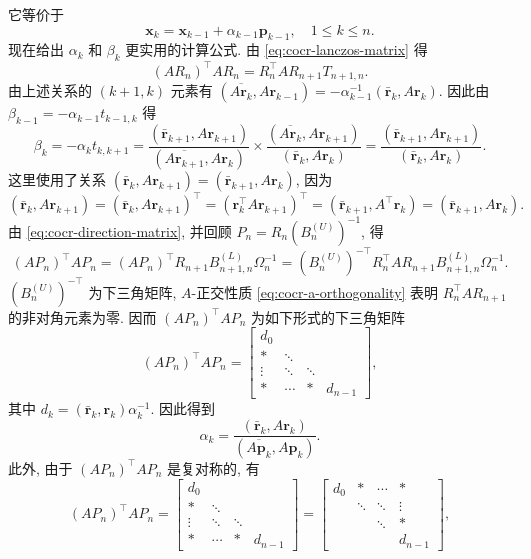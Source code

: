 {它等价于}
\begin{equation}\label{eq:cocr-solution-recurrence}\bm x_k=\bm x_{k-1}+\alpha_{k-1}\bm p_{k-1},\quad1\le k\le n.\end{equation}
{现在给出 $\alpha_k$ 和 $\beta_k$ 更实用的计算公式. 由 \eqref{eq:cocr-lanczos-matrix} 得}
\[(AR_n)^{\top}AR_n=R_n^{\top}AR_{n+1}T_{n+1,n}.\]
{由上述关系的 $(k+1,k)$ 元素有 $(\overline{A\bm r_k},A\bm r_{k-1})=-\alpha_{k-1}^{-1}(\bar{\bm r}_k,A\bm r_k)$. 因此由 $\beta_{k-1}=-\alpha_{k-1}t_{k-1,k}$ 得}
\begin{equation}\label{eq:cocr-beta}
\beta_k=-\alpha_kt_{k,k+1}=\frac{(\bar{\bm r}_{k+1},A\bm r_{k+1})}{(\overline{A\bm r_{k+1}},A\bm r_k)}\times\frac{(\overline{A\bm r_k},A\bm r_{k+1})}{(\bar{\bm r}_k,A\bm r_k)}=\frac{(\bar{\bm r}_{k+1},A\bm r_{k+1})}{(\bar{\bm r}_k,A\bm r_k)}.
\end{equation}
{这里使用了关系 $(\bar{\bm r}_k,A\bm r_{k+1})=(\bar{\bm r}_{k+1},A\bm r_k)$, 因为}
\begin{equation}\label{eq:cocr-bilinear-symmetry}
(\bar{\bm r}_k,A\bm r_{k+1})=(\bar{\bm r}_k,A\bm r_{k+1})^{\top}=(\bm r_k^{\top}A\bm r_{k+1})^{\top}=(\bar{\bm r}_{k+1},A^{\top}\bm r_k)=(\bar{\bm r}_{k+1},A\bm r_k).
\end{equation}
{由 \eqref{eq:cocr-direction-matrix}, 并回顾 $P_n=R_n(B_n^{(U)})^{-1}$, 得}
\[(AP_n)^{\top}AP_n=(AP_n)^{\top}R_{n+1}B_{n+1,n}^{(L)}\Omega_n^{-1}
=(B_n^{(U)})^{-\top}R_n^{\top}AR_{n+1}B_{n+1,n}^{(L)}\Omega_n^{-1}.\]
{$(B_n^{(U)})^{-\top}$ 为下三角矩阵, $A$-正交性质 \eqref{eq:cocr-a-orthogonality} 表明 $R_n^{\top}AR_{n+1}$ 的非对角元素为零. 因而 \linebreak[4]$(AP_n)^{\top}AP_n$ 为如下形式的下三角矩阵}
\[(AP_n)^{\top}AP_n=\begin{bmatrix}d_0&&&\\ *&\ddots&&\\\vdots&\ddots&\ddots&\\ *&\cdots&*&d_{n-1}\end{bmatrix},\]
{其中 $d_k=(\bar{\bm r}_k,\bm r_k)\alpha_k^{-1}$. 因此得到}
\begin{equation}\label{eq:cocr-alpha}\alpha_k=\frac{(\bar{\bm r}_k,A\bm r_k)}{(\overline{A\bm p_k},A\bm p_k)}.\end{equation}
{此外, 由于 $(AP_n)^{\top}AP_n$ 是复对称的, 有}
\[(AP_n)^{\top}AP_n=\begin{bmatrix}d_0&&&\\ *&\ddots&&\\\vdots&\ddots&\ddots&\\ *&\cdots&*&d_{n-1}\end{bmatrix}
=\begin{bmatrix}d_0&*&\cdots&*\\&\ddots&\ddots&\vdots\\&&\ddots&*\\&&&d_{n-1}\end{bmatrix},\]
